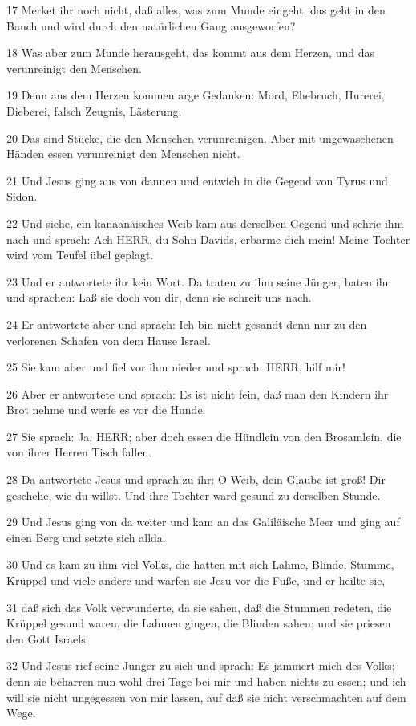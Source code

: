 \par 17 Merket ihr noch nicht, daß alles, was zum Munde eingeht, das geht in den Bauch und wird durch den natürlichen Gang ausgeworfen?
\par 18 Was aber zum Munde herausgeht, das kommt aus dem Herzen, und das verunreinigt den Menschen.
\par 19 Denn aus dem Herzen kommen arge Gedanken: Mord, Ehebruch, Hurerei, Dieberei, falsch Zeugnis, Lästerung.
\par 20 Das sind Stücke, die den Menschen verunreinigen. Aber mit ungewaschenen Händen essen verunreinigt den Menschen nicht.
\par 21 Und Jesus ging aus von dannen und entwich in die Gegend von Tyrus und Sidon.
\par 22 Und siehe, ein kanaanäisches Weib kam aus derselben Gegend und schrie ihm nach und sprach: Ach HERR, du Sohn Davids, erbarme dich mein! Meine Tochter wird vom Teufel übel geplagt.
\par 23 Und er antwortete ihr kein Wort. Da traten zu ihm seine Jünger, baten ihn und sprachen: Laß sie doch von dir, denn sie schreit uns nach.
\par 24 Er antwortete aber und sprach: Ich bin nicht gesandt denn nur zu den verlorenen Schafen von dem Hause Israel.
\par 25 Sie kam aber und fiel vor ihm nieder und sprach: HERR, hilf mir!
\par 26 Aber er antwortete und sprach: Es ist nicht fein, daß man den Kindern ihr Brot nehme und werfe es vor die Hunde.
\par 27 Sie sprach: Ja, HERR; aber doch essen die Hündlein von den Brosamlein, die von ihrer Herren Tisch fallen.
\par 28 Da antwortete Jesus und sprach zu ihr: O Weib, dein Glaube ist groß! Dir geschehe, wie du willst. Und ihre Tochter ward gesund zu derselben Stunde.
\par 29 Und Jesus ging von da weiter und kam an das Galiläische Meer und ging auf einen Berg und setzte sich allda.
\par 30 Und es kam zu ihm viel Volks, die hatten mit sich Lahme, Blinde, Stumme, Krüppel und viele andere und warfen sie Jesu vor die Füße, und er heilte sie,
\par 31 daß sich das Volk verwunderte, da sie sahen, daß die Stummen redeten, die Krüppel gesund waren, die Lahmen gingen, die Blinden sahen; und sie priesen den Gott Israels.
\par 32 Und Jesus rief seine Jünger zu sich und sprach: Es jammert mich des Volks; denn sie beharren nun wohl drei Tage bei mir und haben nichts zu essen; und ich will sie nicht ungegessen von mir lassen, auf daß sie nicht verschmachten auf dem Wege.
